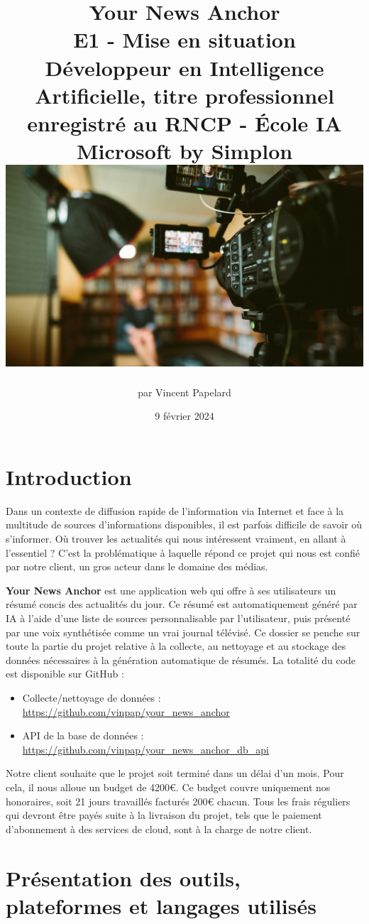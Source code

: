 \documentclass[french]{article}
\title{%
    \huge Your News Anchor  \\
    \bigskip
    \large E1 - Mise en situation \\ 
    Développeur en Intelligence Artificielle,
    titre professionnel enregistré au RNCP - École IA Microsoft by Simplon
    \vfill
    \includegraphics[width=14cm]{cover.jpg} 
    \vfill}
\date{9 février 2024}
\author{par Vincent Papelard}
\begin{document}
    \renewcommand{\contentsname}{Table des Matières}
    \maketitle
    \newpage
    \tableofcontents
    \newpage

    \section*{Introduction}
    Dans un contexte de diffusion rapide de l'information via Internet et face à la multitude de sources d'informations disponibles, il est parfois difficile de savoir où s'informer. Où trouver les actualités qui nous intéressent vraiment, en allant à l'essentiel ? C'est la problématique à laquelle répond ce projet qui nous est confié par notre client, un gros acteur dans le domaine des médias.
    
    \textbf{Your News Anchor} est une application web qui offre à ses utilisateurs un résumé concis des actualités du jour. Ce résumé est automatiquement généré par IA à l'aide d'une liste de sources personnalisable par l'utilisateur, puis présenté par une voix synthétisée comme un vrai journal télévisé.
    Ce dossier se penche sur toute la partie du projet relative à la collecte, au nettoyage et au stockage des données nécessaires à la génération automatique de résumés.
    La totalité du code est disponible sur GitHub :
    \begin{itemize}
        \item Collecte/nettoyage de données : \url{https://github.com/vinpap/your_news_anchor}
        \item API de la base de données : \url{https://github.com/vinpap/your_news_anchor_db_api}
    \end{itemize}

    Notre client souhaite que le projet soit terminé dans un délai d'un mois. Pour cela, il nous alloue un budget de 4200€. Ce budget couvre uniquement nos honoraires, soit 21 jours travaillés facturés 200€ chacun. Tous les frais réguliers qui devront être payés suite à la livraison du projet, tels que le paiement d'abonnement à des services de cloud, sont à la charge de notre client. 

    \section{Présentation des outils, plateformes et langages utilisés}
\end{document}
